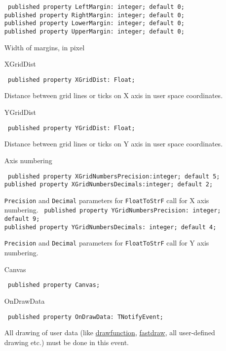 \documentclass[12pt,a4paper,oneside]{report}
\newcommand{\inlineitem}[1]{{\addfontfeatures{FakeBold} #1}}
\newcommand{\code}[1]{\texttt{#1}}
\begin{document}
\begin{itemize}
\begin{flushleft}
\code{
published property LeftMargin: integer; default 0;\\
published property RightMargin: integer; default 0;\\
published property LowerMargin: integer; default 0;\\
published property UpperMargin: integer; default 0;}
\end{flushleft}
\par Width of margins, in pixel
\label{lmcoordsys.TCoordSys-XGridDist}
\item[\inlineitem{XGridDist}\hfill]
\begin{flushleft}
\code{
published property XGridDist: Float;}
\end{flushleft}
Distance between grid lines or ticks on X axis in user space coordinates. \label{lmcoordsys.TCoordSys-YGridDist}
\item[\inlineitem{YGridDist}\hfill]
\begin{flushleft}
\code{
published property YGridDist: Float;}
\end{flushleft}
Distance between grid lines or ticks on Y axis in user space coordinates. 

\label{lmcoordsys.TCoordSys-XGridNumbersPrecision}
\item [\inlineitem{Axis numbering}]
\begin{flushleft}
\code{
published property XGridNumbersPrecision:integer; default 5;\\
published property XGridNumbersDecimals:integer; default 2;}
\end{flushleft}
\par\code{Precision} and \code{Decimal} parameters for \code{FloatToStrF} call for X axis numbering. \label{lmcoordsys.TCoordSys-XGridNumbersDecimals}
\label{lmcoordsys.TCoordSys-YGridNumbersPrecision}
\code{
published property YGridNumbersPrecision: integer; default 9;\\
published property YGridNumbersDecimals: integer; default 4;}
\par \code{Precision} and \code{Decimal} parameters for \code{FloatToStrF} call for Y axis  numbering. \label{lmcoordsys.TCoordSys-YGridNumbersDecimals}
\label{lmcoordsys.TCoordSys-Canvas}
\item[\inlineitem{Canvas}\hfill]
\begin{flushleft}
\code{
published property Canvas;}
\end{flushleft}
\label{lmcoordsys.TCoordSys-OnDrawData}
\item[\inlineitem{OnDrawData}\hfill]
\begin{flushleft}
\code{
published property OnDrawData: TNotifyEvent;}
\end{flushleft}
All drawing of user data (like \hyperref[lmcoordsys.TCoordSys-DrawFunc]{drawfunction}, \hyperref[lmcoordsys.TCoordSys-FastDraw]{fastdraw}, all user-defined drawing etc.) must be done in this event.\end{itemize}
\end{document}
